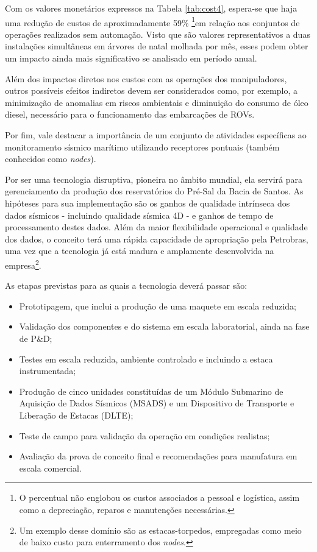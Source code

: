 Com os valores monetários expressos na Tabela \ref{tab:cost4}, espera-se que haja uma redução de custos de aproximadamente 59\%  \footnote{O percentual não englobou os custos associados a pessoal e logística, assim como a depreciação, reparos e manutenções necessárias.}em relação aos conjuntos de operações realizados sem automação. Visto que são valores representativos a duas instalações simultâneas em árvores de natal molhada por mês, esses podem obter um impacto ainda mais significativo se analisado em período anual.

Além dos impactos diretos nos custos com as operações dos manipuladores, outros possíveis efeitos indiretos devem ser considerados como, por exemplo, a minimização de anomalias em riscos ambientais e diminuição do consumo de óleo diesel, necessário para o funcionamento das embarcações de ROVs. 

Por fim, vale destacar a importância de um conjunto de atividades específicas ao monitoramento sísmico marítimo utilizando receptores pontuais (também conhecidos como \textit{nodes}). 

Por ser uma tecnologia disruptiva, pioneira no âmbito mundial, ela servirá para gerenciamento da produção dos reservatórios do Pré-Sal da Bacia de Santos. As hipóteses para sua implementação são os ganhos de qualidade intrínseca dos dados sísmicos - incluindo qualidade sísmica 4D - e ganhos de tempo de processamento destes dados. Além da maior flexibilidade operacional e qualidade dos dados, o conceito terá uma rápida capacidade de apropriação pela Petrobras, uma vez que a tecnologia já está madura e amplamente desenvolvida na empresa\footnote{Um exemplo desse domínio são as estacas-torpedos, empregadas como meio de baixo custo para enterramento dos \textit{nodes}.}.

As etapas previstas para as quais a tecnologia deverá passar são: 

\begin{itemize}
	\item Prototipagem, que inclui a produção de uma maquete em escala reduzida;
	\item Validação dos componentes e do sistema em escala laboratorial, ainda na fase de P\&D;
	\item Testes em escala reduzida, ambiente controlado e incluindo a estaca instrumentada;
	\item Produção de cinco unidades constituídas de um Módulo Submarino de Aquisição de Dados Sísmicos (MSADS) e um Dispositivo de Transporte e Liberação de Estacas (DLTE);
	\item Teste de campo para validação da operação em condições realistas;
	\item Avaliação da prova de conceito final e recomendações para manufatura em escala comercial.
\end{itemize}

